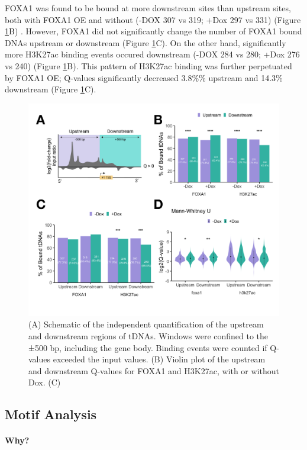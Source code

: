 \documentclass[
  12pt,
]{article}
\begin{document}
FOXA1 was found to be bound at more downstream sites than upstream sites, both with FOXA1 OE and without (-DOX 307 vs 319; +Dox 297 vs 331) (Figure \ref{fig:results-4}B) .
However, FOXA1 did not significantly change the number of FOXA1 bound DNAs upstream or downstream (Figure \ref{fig:results-4}C).
On the other hand, significantly more H3K27ac binding events occured downstream (-DOX 284 vs 280; +Dox 276 vs 240) (Figure \ref{fig:results-4}B).
This pattern of H3K27ac binding was further perpetuated by FOXA1 OE; Q-values significantly decreased 3.8\%\% upstream and 14.3\% downstream (Figure \ref{fig:results-4}C).

\begin{figure}[p]
\includegraphics[width=1\linewidth]{../images/results-04} \caption{(A) Schematic of the independent quantification of the upstream and downstream regions of tDNAs. Windows were confined to the ±500 bp, including the gene body. Binding events were counted if Q-values exceeded the input values. (B) Violin plot of the upstream and downstream Q-values for FOXA1 and H3K27ac, with or without Dox. (C)}\label{fig:results-4}
\end{figure}

\hypertarget{motif-analysis-1}{%
\subsection{Motif Analysis}\label{motif-analysis-1}}

\hypertarget{why}{%
\paragraph{Why?}\label{why}}
\end{document}
